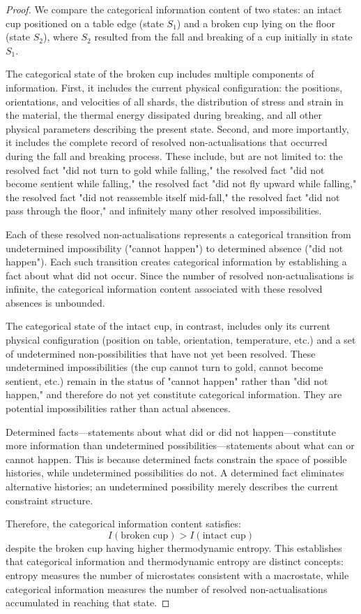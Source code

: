 \documentclass[12pt,a4paper]{article}
\theoremstyle{definition}
\theoremstyle{remark}
\begin{document}
\begin{proof}
We compare the categorical information content of two states: an intact cup positioned on a table edge (state $S_1$) and a broken cup lying on the floor (state $S_2$), where $S_2$ resulted from the fall and breaking of a cup initially in state $S_1$.

The categorical state of the broken cup includes multiple components of information. First, it includes the current physical configuration: the positions, orientations, and velocities of all shards, the distribution of stress and strain in the material, the thermal energy dissipated during breaking, and all other physical parameters describing the present state. Second, and more importantly, it includes the complete record of resolved non-actualisations that occurred during the fall and breaking process. These include, but are not limited to: the resolved fact "did not turn to gold while falling," the resolved fact "did not become sentient while falling," the resolved fact "did not fly upward while falling," the resolved fact "did not reassemble itself mid-fall," the resolved fact "did not pass through the floor," and infinitely many other resolved impossibilities.

Each of these resolved non-actualisations represents a categorical transition from undetermined impossibility ("cannot happen") to determined absence ("did not happen"). Each such transition creates categorical information by establishing a fact about what did not occur. Since the number of resolved non-actualisations is infinite, the categorical information content associated with these resolved absences is unbounded.

The categorical state of the intact cup, in contrast, includes only its current physical configuration (position on table, orientation, temperature, etc.) and a set of undetermined non-possibilities that have not yet been resolved. These undetermined impossibilities (the cup cannot turn to gold, cannot become sentient, etc.) remain in the status of "cannot happen" rather than "did not happen," and therefore do not yet constitute categorical information. They are potential impossibilities rather than actual absences.

Determined facts—statements about what did or did not happen—constitute more information than undetermined possibilities—statements about what can or cannot happen. This is because determined facts constrain the space of possible histories, while undetermined possibilities do not. A determined fact eliminates alternative histories; an undetermined possibility merely describes the current constraint structure.

Therefore, the categorical information content satisfies:
\begin{equation}
I(\text{broken cup}) > I(\text{intact cup})
\end{equation}
despite the broken cup having higher thermodynamic entropy. This establishes that categorical information and thermodynamic entropy are distinct concepts: entropy measures the number of microstates consistent with a macrostate, while categorical information measures the number of resolved non-actualisations accumulated in reaching that state.
\end{proof}
\end{document}

